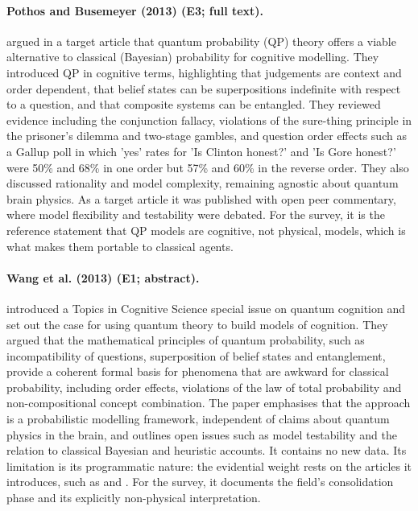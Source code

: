 \documentclass[10pt,a4paper]{article}
\begin{document}
\paragraph{Pothos and Busemeyer (2013) (E3; full text).} \citet{Pothos2013a} argued in a target article that quantum probability (QP) theory offers a viable alternative to classical (Bayesian) probability for cognitive modelling. They introduced QP in cognitive terms, highlighting that judgements are context and order dependent, that belief states can be superpositions indefinite with respect to a question, and that composite systems can be entangled. They reviewed evidence including the conjunction fallacy, violations of the sure-thing principle in the prisoner's dilemma and two-stage gambles, and question order effects such as a Gallup poll in which 'yes' rates for 'Is Clinton honest?' and 'Is Gore honest?' were 50\% and 68\% in one order but 57\% and 60\% in the reverse order. They also discussed rationality and model complexity, remaining agnostic about quantum brain physics. As a target article it was published with open peer commentary, where model flexibility and testability were debated. For the survey, it is the reference statement that QP models are cognitive, not physical, models, which is what makes them portable to classical agents.

\paragraph{Wang et al. (2013) (E1; abstract).} \citet{Wang2013a} introduced a Topics in Cognitive Science special issue on quantum cognition and set out the case for using quantum theory to build models of cognition. They argued that the mathematical principles of quantum probability, such as incompatibility of questions, superposition of belief states and entanglement, provide a coherent formal basis for phenomena that are awkward for classical probability, including order effects, violations of the law of total probability and non-compositional concept combination. The paper emphasises that the approach is a probabilistic modelling framework, independent of claims about quantum physics in the brain, and outlines open issues such as model testability and the relation to classical Bayesian and heuristic accounts. It contains no new data. Its limitation is its programmatic nature: the evidential weight rests on the articles it introduces, such as \citep{Wang2013b} and \citep{Aerts2013}. For the survey, it documents the field's consolidation phase and its explicitly non-physical interpretation.
\end{document}
